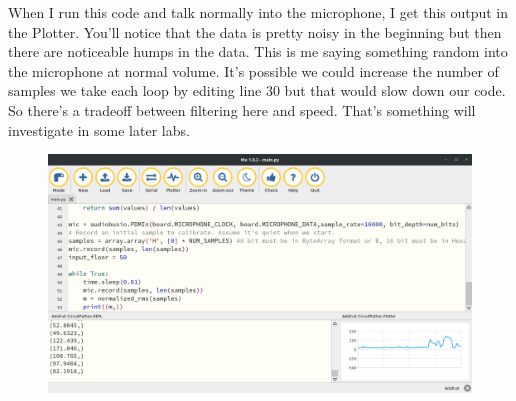 {\begin{figure}[H]
\begin{center}
  \end{center}
\end{figure}
When I run this code and talk normally into the microphone, I get this
output in the Plotter. You’ll notice that the data is pretty noisy in
the beginning but then there are noticeable humps in the data. This is me saying something random into the microphone at normal volume. It’s possible we could increase the number of samples we take each loop by editing line 30 but that would slow down our code. So there’s a tradeoff between filtering here and speed. That’s
something will investigate in some later labs. 
\begin{figure}[H]
  \begin{center}
    \includegraphics[width=\textwidth]{Figures/sound_mu.png}
  \end{center}
\end{figure}
}
